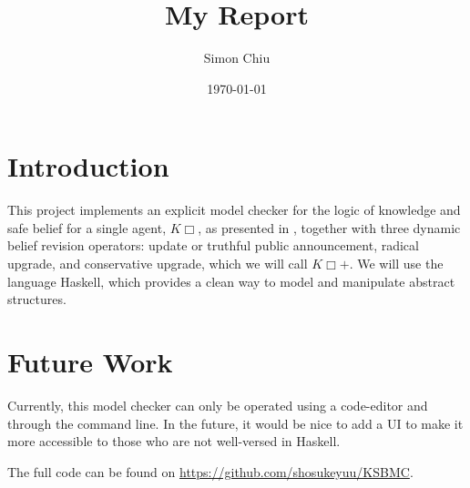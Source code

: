\documentclass[12pt,a4paper]{article}
\title{My Report}
\author{Simon Chiu}
\date{\today}
\begin{document}
\maketitle

\vfill

\tableofcontents

\clearpage


\section{Introduction}\label{sec:Introduction}
This project implements an explicit model checker for the logic of knowledge and safe belief for a single agent, $K\Box$, as presented in \cite{baltagQualitativeTheoryDynamic2008}, together with three dynamic belief revision operators: update or truthful public announcement, radical upgrade, and conservative upgrade, which we will call $K\Box +$. We will use the language Haskell, which provides a clean way to model and manipulate abstract structures.









\section{Future Work}\label{sec:Conclusion}
Currently, this model checker can only be operated using a code-editor and through the command line. In the future, it would be nice to add a UI to make it more accessible to those who are not well-versed in Haskell. 

The full code can be found on \url{https://github.com/shosukeyuu/KSBMC}.



\end{document}
